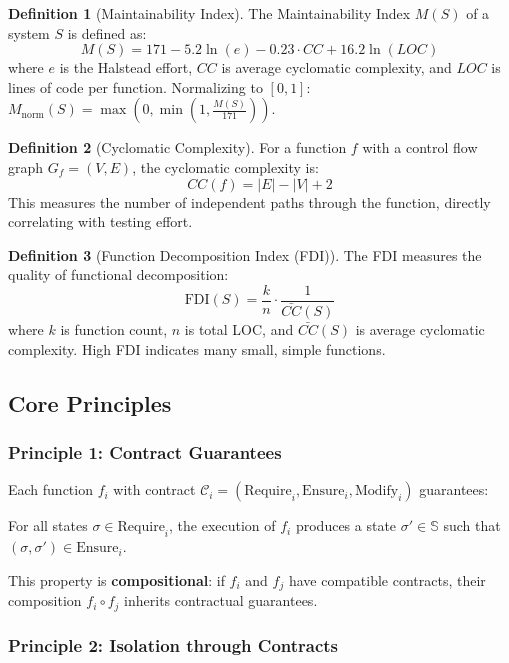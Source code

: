\documentclass[a4paper,12pt]{article}
\theoremstyle{definition}
\newtheorem{definition}{Definition}
\begin{document}
\begin{definition}[Maintainability Index]
The Maintainability Index $M(S)$ of a system $S$ is defined as:
\[
M(S) = 171 - 5.2 \ln(e) - 0.23 \cdot CC + 16.2 \ln(LOC)
\]
where $e$ is the Halstead effort, $CC$ is average cyclomatic complexity, and $LOC$ is lines of code per function. Normalizing to $[0, 1]$: $M_{\text{norm}}(S) = \max(0, \min(1, \frac{M(S)}{171}))$.
\end{definition}

\begin{definition}[Cyclomatic Complexity]
For a function $f$ with a control flow graph $G_f = (V, E)$, the cyclomatic complexity is:
\[
CC(f) = |E| - |V| + 2
\]
This measures the number of independent paths through the function, directly correlating with testing effort.
\end{definition}

\begin{definition}[Function Decomposition Index (FDI)]
The FDI measures the quality of functional decomposition:
\[
\mathrm{FDI}(S) = \frac{k}{n} \cdot \frac{1}{\bar{CC}(S)}
\]
where $k$ is function count, $n$ is total LOC, and $\bar{CC}(S)$ is average cyclomatic complexity. High FDI indicates many small, simple functions.
\end{definition}

\subsection{Core Principles}

\subsubsection{Principle 1: Contract Guarantees}

Each function $f_i$ with contract $\mathcal{C}_i = (\mathrm{Require}_i, \mathrm{Ensure}_i, \mathrm{Modify}_i)$ guarantees:

For all states $\sigma \in \mathrm{Require}_i$, the execution of $f_i$ produces a state $\sigma' \in \mathbb{S}$ such that $(\sigma, \sigma') \in \mathrm{Ensure}_i$.

This property is \textbf{compositional}: if $f_i$ and $f_j$ have compatible contracts, their composition $f_i \circ f_j$ inherits contractual guarantees.

\subsubsection{Principle 2: Isolation through Contracts}
\end{document}

